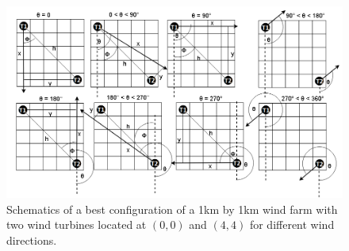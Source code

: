     \begin{figure}[H]
        \centering
        \includegraphics[width=\linewidth]{Figures/bestSmall.png}
        \caption{Schematics of a best configuration of a 1km by 1km wind farm with two wind turbines located at $(0,0)$ and $(4,4)$ for different wind directions.}
        \label{bestSmall}
    \end{figure}

